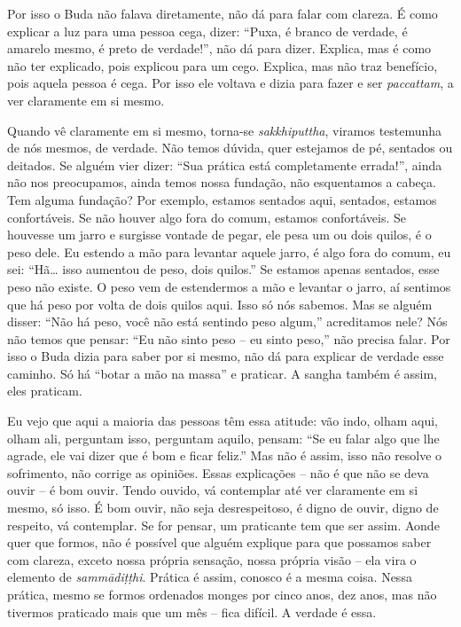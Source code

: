 Por isso o Buda não falava diretamente, não dá para falar com
clareza. É como explicar a luz para uma pessoa cega, dizer: “Puxa, é
branco de verdade, é amarelo mesmo, é preto de verdade!”, não dá para
dizer. Explica, mas é como não ter explicado, pois explicou para um
cego. Explica, mas não traz benefício, pois aquela pessoa é cega. Por
isso ele voltava e dizia para fazer e ser \textit{paccattam}, a ver
claramente em si mesmo. 

Quando vê claramente em si mesmo, torna-se \textit{sakkhiputtha},
viramos testemunha de nós mesmos, de verdade. Não temos dúvida, quer
estejamos de pé, sentados ou deitados. Se alguém vier dizer: “Sua
prática está completamente errada!”, ainda não nos preocupamos, ainda
temos nossa fundação, não esquentamos a cabeça. Tem alguma fundação?
Por exemplo, estamos sentados aqui, sentados, estamos confortáveis. Se
não houver algo fora do comum, estamos confortáveis. Se houvesse um
jarro e surgisse vontade de pegar, ele pesa um ou dois quilos, é o peso
dele. Eu estendo a mão para levantar aquele jarro, é algo fora do
comum, eu sei: “Hã… isso aumentou de peso, dois quilos.” Se estamos
apenas sentados, esse peso não existe. O peso vem de estendermos a mão
e levantar o jarro, aí sentimos que há peso por volta de dois quilos
aqui. Isso só nós sabemos. Mas se alguém disser: “Não há peso, você não
está sentindo peso algum,” acreditamos nele? Nós não temos que pensar:
“Eu não sinto peso – eu sinto peso,” não precisa falar. Por isso o Buda
dizia para saber por si mesmo, não dá para explicar de verdade esse
caminho. Só há “botar a mão na massa” e praticar. A sangha também é
assim, eles praticam.

Eu vejo que aqui a maioria das pessoas têm essa atitude: vão indo,
olham aqui, olham ali, perguntam isso, perguntam aquilo, pensam: “Se eu
falar algo que lhe agrade, ele vai dizer que é bom e ficar feliz.” Mas
não é assim, isso não resolve o sofrimento, não corrige as opiniões.
Essas explicações – não é que não se deva ouvir – é bom ouvir. Tendo
ouvido, vá contemplar até ver claramente em si mesmo, só isso. É bom
ouvir, não seja desrespeitoso, é digno de ouvir, digno de respeito, vá
contemplar. Se for pensar, um praticante tem que ser assim. Aonde quer
que formos, não é possível que alguém explique para que possamos saber
com clareza, exceto nossa própria sensação, nossa própria visão – ela
vira o elemento de \textit{sammādiṭṭhi}. Prática é assim, conosco é a
mesma coisa. Nessa prática, mesmo se formos ordenados monges por cinco
anos, dez anos, mas não tivermos praticado mais que um mês – fica
difícil. A verdade é essa. 

